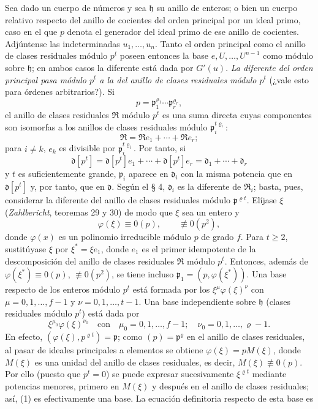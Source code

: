 Sea dado un cuerpo de números y sea $\mathfrak h$ su anillo de enteros; o bien un cuerpo relativo respecto del anillo de cocientes del orden principal por un ideal primo, caso en el que $p$ denota el generador del ideal primo de ese anillo de cocientes. Adjúntense las indeterminadas $u_1,\ldots,u_n$. Tanto el orden principal como el anillo de clases residuales módulo $p^t$ poseen entonces la base $e,U,\ldots,U^{n-1}$ como módulo sobre $\mathfrak h$; en ambos casos la diferente está dada por $G'(u)$. \emph{La diferente del orden principal pasa módulo $p^t$ a la del anillo de clases residuales módulo $p^t$} (¿vale esto para órdenes arbitrarios?). Si
\[
p=\mathfrak p_1^{\varrho_1}\cdots\mathfrak p_r^{\varrho_r},
\]
el anillo de clases residuales $\mathfrak R$ módulo $p^t$ es una suma directa cuyas componentes son isomorfas a los anillos de clases residuales módulo $\mathfrak p_i^{t\varrho_i}$:
\[
\mathfrak R=\mathfrak R e_1+\cdots+\mathfrak R e_r;
\]
para $i\ne k$, $e_k$ es divisible por $\mathfrak p_i^{t\varrho_i}$. Por tanto, si
\[
\mathfrak d[p^t]=\mathfrak d[p^t]e_1+\cdots+\mathfrak d[p^t]e_r
=\mathfrak d_1+\cdots+\mathfrak d_r
\]
y $t$ es suficientemente grande, $\mathfrak p_i$ aparece en $\mathfrak d_i$ con la misma potencia que en $\mathfrak d[p^t]$ y, por tanto, que en $\mathfrak d$. Según el § 4, $\mathfrak d_i$ es la diferente de $\mathfrak R_i$; basta, pues, considerar la diferente del anillo de clases residuales módulo $\mathfrak p^{\varrho t}$. Elíjase $\xi$ (\emph{Zahlbericht}, teoremas 29 y 30) de modo que $\xi$ sea un entero y
\[
\varphi(\xi)\equiv0(p),
\qquad \not\equiv0(p^2),
\]
donde $\varphi(x)$ es un polinomio irreducible módulo $p$ de grado $f$. Para $t\ge2$, sustitúyase $\xi$ por $\xi^*=\xi e_1$, donde $e_1$ es el primer idempotente de la descomposición del anillo de clases residuales $\mathfrak R$ módulo $p^t$. Entonces, además de $\varphi(\xi^*)\equiv0(p)$, $\not\equiv0(p^2)$, se tiene incluso $\mathfrak p_1=(p,\varphi(\xi^*))$. Una base respecto de los enteros módulo $p^t$ está formada por los $\xi^\mu\varphi(\xi)^\nu$ con $\mu=0,1,\ldots,f-1$ y $\nu=0,1,\ldots,t-1$. Una base independiente sobre $\mathfrak h$ (clases residuales módulo $p^t$) está dada por
\begin{equation}
\xi^{\mu_0}\varphi(\xi)^{\nu_0}
\quad\text{con}\quad
\mu_0=0,1,\ldots,f-1;
\quad \nu_0=0,1,\ldots,\varrho-1. \tag{1}
\end{equation}
En efecto, $(\varphi(\xi),p^{\varrho t})=\mathfrak p$; como $(p)=\mathfrak p^\varrho$ en el anillo de clases residuales, al pasar de ideales principales a elementos se obtiene $\varphi(\xi)=pM(\xi)$, donde $M(\xi)$ es una unidad del anillo de clases residuales, es decir, $M(\xi)\not\equiv0(p)$. Por ello (puesto que $p^t=0$) se puede expresar sucesivamente $\xi^{\varrho t}$ mediante potencias menores, primero en $M(\xi)$ y después en el anillo de clases residuales; así, (1) es efectivamente una base. La ecuación definitoria respecto de esta base es
